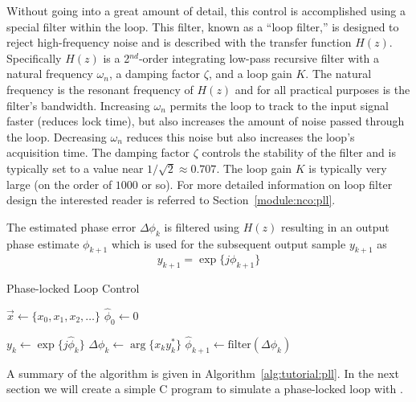 Without going into a great amount of detail, this control is
accomplished using a special filter within the loop.
This filter, known as a ``loop filter,'' is designed to reject
high-frequency noise and is described with the transfer function $H(z)$.
Specifically $H(z)$ is a 2$^{nd}$-order integrating low-pass recursive
filter with
a natural frequency $\omega_n$,
a damping factor $\zeta$, and
a loop gain $K$.
The natural frequency is the resonant frequency of $H(z)$ and for all
practical purposes is the filter's bandwidth.
Increasing $\omega_n$ permits the loop to track to the input signal
faster (reduces lock time), but also increases the amount of noise
passed through the loop.
Decreasing $\omega_n$ reduces this noise but also increases the loop's
acquisition time.
The damping factor $\zeta$ controls the stability of the filter and is
typically set to a value near $1/\sqrt{2} \approx 0.707$.
The loop gain $K$ is typically very large
(on the order of $1000$ or so).
For more detailed information on loop filter design the interested
reader is referred to Section~\ref{module:nco:pll}.

The estimated phase error $\Delta\phi_k$ is filtered using $H(z)$
resulting in an output phase estimate $\phi_{k+1}$
which is used for the subsequent output sample $y_{k+1}$ as
%
\begin{equation}
\label{eqn:tutoral:pll:y1}
    y_{k+1} = \exp\bigl\{ j\phi_{k+1} \bigr\}
\end{equation}
%
\begin{algorithm}[H]
\caption{Phase-locked Loop Control}
\label{alg:tutorial:pll}
\begin{algorithmic}[1]
\STATE $\vec{x} \leftarrow \{x_0,x_1,x_2,\ldots\}$    
\STATE $\hat{\phi}_0 \leftarrow 0$          

    \STATE $y_k \leftarrow \exp\bigl\{ j\hat{\phi}_k \bigr\}$ 
    \STATE $\Delta\phi_k \leftarrow \arg\bigl\{ x_k y_k^* \bigr\}$ 
    \STATE $\hat{\phi}_{k+1} \leftarrow \text{filter}(\Delta\phi_k)$ 
\ENDFOR
\end{algorithmic}
\end{algorithm}
%
A summary of the algorithm is given in Algorithm~\ref{alg:tutorial:pll}.
In the next section we will create a simple C program to simulate a
phase-locked loop with \liquid.


